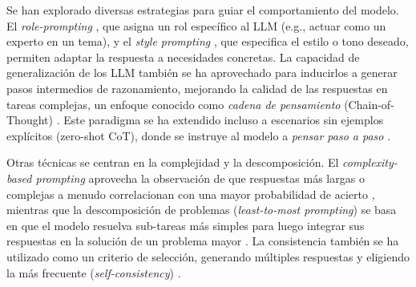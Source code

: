 Se han explorado diversas estrategias para guiar el comportamiento del modelo. El \textit{role-prompting} \parencite{kongBetterZeroShotReasoning2024}, que asigna un rol específico al LLM (e.g., actuar como un experto en un tema), y el \textit{style prompting} \parencite{luBoundingCapabilitiesLarge2023}, que especifica el estilo o tono deseado, permiten adaptar la respuesta a necesidades concretas. La capacidad de generalización de los LLM también se ha aprovechado para inducirlos a generar pasos intermedios de razonamiento, mejorando la calidad de las respuestas en tareas complejas, un enfoque conocido como \textit{cadena de pensamiento} (Chain-of-Thought) \parencite{nyeShowYourWork2021, weiChainofThoughtPromptingElicits2023}. Este paradigma se ha extendido incluso a escenarios sin ejemplos explícitos (zero-shot CoT), donde se instruye al modelo a \textit{pensar paso a paso} \parencite{kojimaLargeLanguageModels2023, wangPlanandSolvePromptingImproving2023}.

Otras técnicas se centran en la complejidad y la descomposición. El \textit{complexity-based prompting} aprovecha la observación de que respuestas más largas o complejas a menudo correlacionan con una mayor probabilidad de acierto \parencite{fuComplexityBasedPromptingMultiStep2023}, mientras que la descomposición de problemas (\textit{least-to-most prompting}) se basa en que el modelo resuelva sub-tareas más simples para luego integrar sus respuestas en la solución de un problema mayor \parencite{zhouLeasttoMostPromptingEnables2023}. La consistencia también se ha utilizado como un criterio de selección, generando múltiples respuestas y eligiendo la más frecuente (\textit{self-consistency}) \parencite{wangSelfConsistencyImprovesChain2023}.

